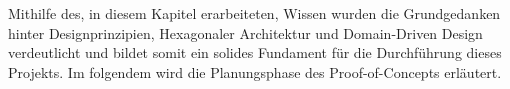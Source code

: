 Mithilfe des, in diesem Kapitel erarbeiteten, Wissen wurden die Grundgedanken hinter Designprinzipien, Hexagonaler Architektur und Domain-Driven Design verdeutlicht und bildet somit ein solides Fundament für die Durchführung dieses Projekts. Im folgendem wird die Planungsphase des Proof-of-Concepts erläutert.
















































